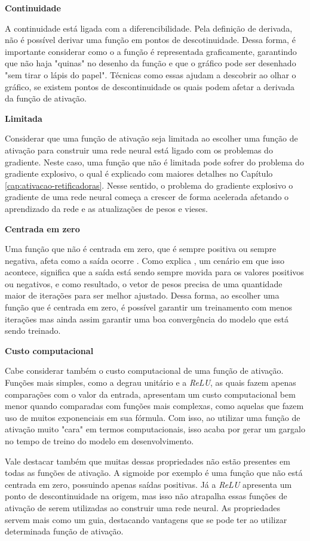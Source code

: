 \textbf{Continuidade}

A continuidade está ligada com a diferencibilidade. Pela definição de derivada, não é possível derivar uma função em pontos de descotinuidade. Dessa forma, é importante considerar como o a função é representada graficamente, garantindo que não haja "quinas" no desenho da função e que o gráfico pode ser desenhado "sem tirar o lápis do papel". Técnicas como essas ajudam a descobrir ao olhar o gráfico, se existem pontos de descontinuidade os quais podem afetar a derivada da função de ativação.

\textbf{Limitada}

Considerar que uma função de ativação seja limitada ao escolher uma função de ativação para construir uma rede neural está ligado com os problemas do gradiente. Neste caso, uma função que não é limitada pode sofrer do problema do gradiente explosivo, o qual é explicado com maiores detalhes no Capítulo \ref{cap:ativacao-retificadoras}. Nesse sentido, o problema do gradiente explosivo o gradiente de uma rede neural começa a crescer de forma acelerada afetando o aprendizado da rede e as atualizações de pesos e vieses.

\textbf{Centrada em zero}

Uma função que não é centrada em zero, que é sempre positiva ou sempre negativa, afeta como a saída ocorre \parencite{PropriedadesFuncoesDeAtivacao}. Como explica \textcite{PropriedadesFuncoesDeAtivacao}, um cenário em que isso acontece, significa que a saída está sendo sempre movida para os valores positivos ou negativos, e como resultado, o vetor de pesos precisa de uma quantidade maior de iterações para ser melhor ajustado. Dessa forma, ao escolher uma função que é centrada em zero, é possível garantir um treinamento com menos iterações mas ainda assim garantir uma boa convergência do modelo que está sendo treinado.

\textbf{Custo computacional}

Cabe considerar também o custo computacional de uma função de ativação. Funções mais simples, como a degrau unitário e a \textit{ReLU}, as quais fazem apenas comparações com o valor da entrada, apresentam um custo computacional bem menor quando comparadas com funções mais complexas, como aquelas que fazem uso de muitos exponenciais em sua fórmula. Com isso, ao utilizar uma função de ativação muito "cara" em termos computacionais, isso acaba por gerar um gargalo no tempo de treino do modelo em desenvolvimento.

Vale destacar também que muitas dessas propriedades não estão presentes em todas as funções de ativação. A sigmoide por exemplo é uma função que não está centrada em zero, possuindo apenas saídas positivas. Já a \textit{ReLU} apresenta um ponto de descontinuidade na origem, mas isso não atrapalha essas funções de ativação de serem utilizadas ao construir uma rede neural. As propriedades servem mais como um guia, destacando vantagens que se pode ter ao utilizar determinada função de ativação.

